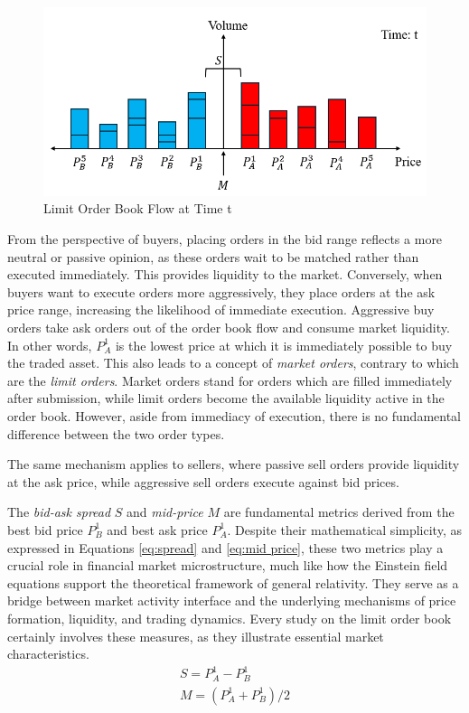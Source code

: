 \begin{figure}[h]
    \centering
    \includegraphics[width=0.8\linewidth]{figures/order_book_t.png}
    \caption{Limit Order Book Flow at Time t}
    \label{fig: order_book_t}
\end{figure}

From the perspective of buyers, placing orders in the bid range reflects a more neutral or passive opinion, as these orders wait to be matched rather than executed immediately. This provides liquidity to the market. Conversely, when buyers want to execute orders more aggressively, they place orders at the ask price range, increasing the likelihood of immediate execution. Aggressive buy orders take ask orders out of the order book flow and consume market liquidity. In other words, $P_A ^ {1}$ is the lowest price at which it is immediately possible to buy the traded asset. This also leads to a concept of \textit{market orders}, contrary to which are the \textit{limit orders}. Market orders stand for orders which are filled immediately after submission, while limit orders become the available liquidity active in the order book. However, aside from immediacy of execution, there is no fundamental difference between the two order types.

The same mechanism applies to sellers, where passive sell orders provide liquidity at the ask price, while aggressive sell orders execute against bid prices.

The \textit{bid-ask spread} $S$ and \textit{mid-price} $M$ are fundamental metrics derived from the best bid price $P_B ^ {1}$ and best ask price $P_A ^ {1}$. Despite their mathematical simplicity, as expressed in Equations \ref{eq:spread} and \ref{eq:mid price}, these two metrics play a crucial role in financial market microstructure, much like how the Einstein field equations support the theoretical framework of general relativity. They serve as a bridge between market activity interface and the underlying mechanisms of price formation, liquidity, and trading dynamics. Every study on the limit order book certainly involves these measures, as they illustrate essential market characteristics.
\begin{align}
    S = P_A ^ {1} - P_B ^ {1}  \label{eq:spread}\\
    M = (P_A ^ {1} + P_B ^ {1})/2
    \label{eq:mid price}
\end{align}

